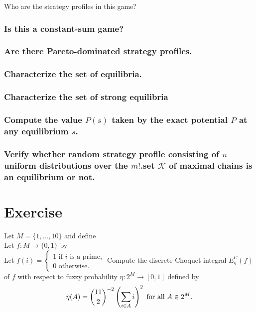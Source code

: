 \documentclass{article}
\begin{document}
Who are the strategy profiles in this game?

\subsubsection{Is this a constant-sum game?}

\subsubsection{Are there Pareto-dominated strategy profiles.}

\subsubsection{Characterize the set of equilibria.}

\subsubsection{Characterize the set of strong equilibria}

\subsubsection{Compute the value $P(s)$ taken by the exact potential $P$ at any equilibrium $s$.}

\subsubsection{Verify whether random strategy profile consisting of $n$ uniform distributions over the $m!$.set $\mathcal{K}$ of maximal chains is an equilibrium or not.}

\section{Exercise}
Let $M=\{1,\ldots,10\}$ and define \\
Let $f:M\rightarrow\{0,1\}$ by \\
Let $f(i)=\left\{\begin{array}{c}
                        1\text{ if }i\text{ is a prime,}\\
                        0\text{ otherwise.}
             \end{array}\right .$
Compute the discrete Choquet integral $E_{\eta}^C(f)$ of $f$ with respect to fuzzy probability $\eta:2^M\rightarrow[0,1]$ defined by
$$\eta(A)=\binom{11}{2}^{-2}\left(\sum_{i\in A}i\right)^2\text{ for all }A\in 2^M\text .$$
\end{document}

